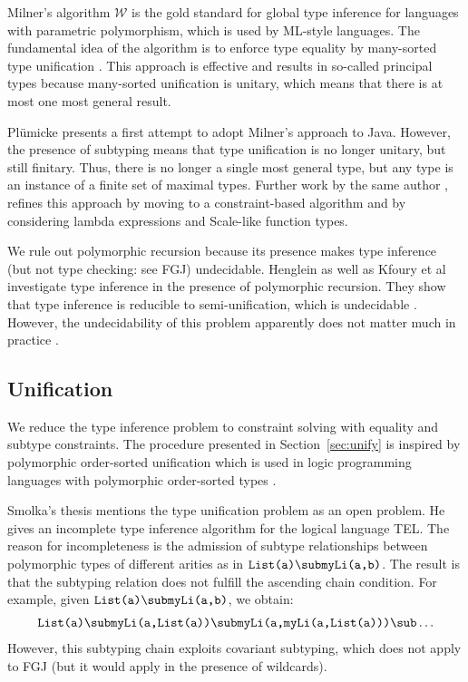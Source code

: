Milner's algorithm $\mathcal{W}$ \cite{DBLP:journals/jcss/Milner78} is
the gold standard for global type inference for languages with 
parametric polymorphism, which is used by ML-style languages. The fundamental idea
of the algorithm is to enforce type equality by many-sorted type
unification \cite{Rob65,MM82}. This approach is effective and results
in so-called principal types because many-sorted unification is
unitary, which means that there is at most one most general result.

Pl\"umicke \cite{Plue07_3} presents a first attempt to adopt Milner's
approach to Java. However, the presence of subtyping means that type
unification is no longer unitary, but still finitary. Thus, there is
no longer a single most general type, but any type is an instance of a
finite set of maximal types. Further work by the same author \cite{plue15_2,plue17_2},
refines this approach by moving to a constraint-based algorithm and by
considering lambda expressions and Scale-like function types.

We rule out polymorphic recursion because its presence makes type
inference (but not type checking: see FGJ) undecidable. Henglein
\cite{DBLP:journals/toplas/Henglein93} as well as Kfoury et al
\cite{DBLP:journals/toplas/KfouryTU93} investigate type inference in
the presence of polymorphic recursion. They show that type inference
is reducible to semi-unification, which is undecidable
\cite{DBLP:journals/iandc/KfouryTU93}. However, the undecidability of
this problem apparently does not matter much in practice
\cite{DBLP:journals/tcs/EmmsL99}. 

\subsection{Unification}

We reduce the type inference problem to constraint solving with
equality and subtype constraints.
The procedure presented in Section~\ref{sec:unify} is inspired by
polymorphic order-sorted unification which is used in logic 
programming languages with polymorphic order-sorted types
\cite{GS89,MH91,HiTo92,CB95}.

Smolka's thesis \cite{GS89} mentions the type unification problem
as an open problem. He gives  an incomplete type inference algorithm
for the logical language \textsf{TEL}. The reason for incompleteness
is the admission of subtype relationships between polymorphic types of
different arities as in  $\texttt{List(a)} \sub
\texttt{myLi(a,b)}$. The result is that the subtyping relation does
not fulfill the ascending chain condition.
For example, given  $\texttt{List(a)} \sub \texttt{myLi(a,b)}$, we obtain:
\begin{gather*}
  \texttt{List(a)} \sub \texttt{myLi(a,List(a))} \sub \texttt{myLi(a,myLi(a,List(a)))}  \sub \dots
\end{gather*}
However, this subtyping chain exploits covariant subtyping, which does
not apply to FGJ (but it would apply in the presence of wildcards).

